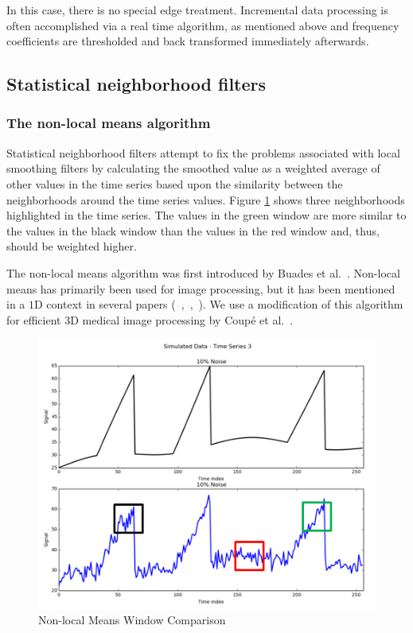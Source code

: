 \documentclass[11pt]{article}
\theoremstyle{definition}
\begin{document}
In this case, there is no special edge treatment. Incremental data
processing is often accomplished via a real time algorithm, as
mentioned above and frequency coefficients are thresholded and back
transformed immediately afterwards.

\subsection{Statistical neighborhood filters}
\subsubsection{The non-local means algorithm} 
Statistical neighborhood filters attempt to fix the problems
associated with local smoothing filters by calculating the smoothed
value as a weighted average of other values in the time series based
upon the similarity between the neighborhoods around the time series
values. Figure \ref{nlmeansdemo} shows three neighborhoods highlighted
in the time series. The values in the green window are more similar to
the values in the black window than the values in the red window and,
thus, should be weighted higher.

The non-local means algorithm was first introduced by Buades et
al.~\cite{Buades05}. Non-local means has primarily been used for image
processing, but it has been mentioned in a $1$D context in several
papers (~\cite{Galiano13},~\cite{Tracey12},~\cite{Zoican10}). We use
a modification of this algorithm for efficient $3$D medical image
processing by Coup{\'e} et al.~\cite{Coupe07}.

\begin{figure}
\centering
\includegraphics[width = 0.65 \textwidth]{NLMeansDemo.png}
\caption{Non-local Means Window Comparison}
\label{nlmeansdemo}
\end{figure}
\end{document}
